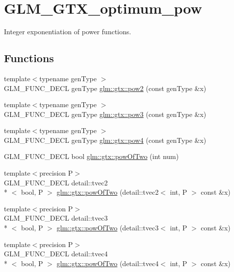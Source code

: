 \hypertarget{group__gtx__optimum__pow}{\section{G\-L\-M\-\_\-\-G\-T\-X\-\_\-optimum\-\_\-pow}
\label{group__gtx__optimum__pow}
}


Integer exponentiation of power functions.  


\subsection*{Functions}
\begin{DoxyCompactItemize}
\item 
{\footnotesize template$<$typename gen\-Type $>$ }\\G\-L\-M\-\_\-\-F\-U\-N\-C\-\_\-\-D\-E\-C\-L gen\-Type \hyperlink{group__gtx__optimum__pow_gad18baedb0f3eaea4b4544771e19574f5}{glm\-::gtx\-::pow2} (const gen\-Type \&x)
\item 
{\footnotesize template$<$typename gen\-Type $>$ }\\G\-L\-M\-\_\-\-F\-U\-N\-C\-\_\-\-D\-E\-C\-L gen\-Type \hyperlink{group__gtx__optimum__pow_ga47dbbd973d7ad8be1b135d57281e16cf}{glm\-::gtx\-::pow3} (const gen\-Type \&x)
\item 
{\footnotesize template$<$typename gen\-Type $>$ }\\G\-L\-M\-\_\-\-F\-U\-N\-C\-\_\-\-D\-E\-C\-L gen\-Type \hyperlink{group__gtx__optimum__pow_gabae007bac8e442a2601db03de5827107}{glm\-::gtx\-::pow4} (const gen\-Type \&x)
\item 
G\-L\-M\-\_\-\-F\-U\-N\-C\-\_\-\-D\-E\-C\-L bool \hyperlink{group__gtx__optimum__pow_ga399b24df28267c1f061c462dd359affd}{glm\-::gtx\-::pow\-Of\-Two} (int num)
\item 
{\footnotesize template$<$precision P$>$ }\\G\-L\-M\-\_\-\-F\-U\-N\-C\-\_\-\-D\-E\-C\-L detail\-::tvec2\\*
$<$ bool, P $>$ \hyperlink{group__gtx__optimum__pow_ga2dff80972edb8f4be69e40bb27ed0a9b}{glm\-::gtx\-::pow\-Of\-Two} (detail\-::tvec2$<$ int, P $>$ const \&x)
\item 
{\footnotesize template$<$precision P$>$ }\\G\-L\-M\-\_\-\-F\-U\-N\-C\-\_\-\-D\-E\-C\-L detail\-::tvec3\\*
$<$ bool, P $>$ \hyperlink{group__gtx__optimum__pow_ga103cbf6e3d63ab4c2bb5449e19b8639d}{glm\-::gtx\-::pow\-Of\-Two} (detail\-::tvec3$<$ int, P $>$ const \&x)
\item 
{\footnotesize template$<$precision P$>$ }\\G\-L\-M\-\_\-\-F\-U\-N\-C\-\_\-\-D\-E\-C\-L detail\-::tvec4\\*
$<$ bool, P $>$ \hyperlink{group__gtx__optimum__pow_ga3471bc7e9e580f6b76647cb5156135cc}{glm\-::gtx\-::pow\-Of\-Two} (detail\-::tvec4$<$ int, P $>$ const \&x)
\end{DoxyCompactItemize}


